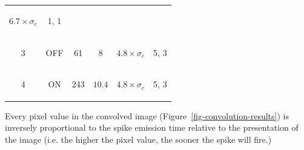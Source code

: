 \begin{table}[htb]
\begin{center}
\begin{tabular}{c c c c c c}
      \begin{mycell}{1.6cm}$6.7 \times \sigma_c$ \end{mycell}& 
      \begin{mycell}{1.6cm}1, 1 \end{mycell}\\
			\begin{mycell}{0.8cm} 3 \end{mycell} &
			\begin{mycell}{1.1cm} \textsc{OFF}\end{mycell} & 
			\begin{mycell}{1.1cm} 61 \end{mycell}& 
			\begin{mycell}{1.6cm}$8$ \end{mycell}& 
      \begin{mycell}{1.6cm}$4.8 \times \sigma_c$ \end{mycell}& 
      \begin{mycell}{1.6cm}5, 3\end{mycell} \\
			\begin{mycell}{0.8cm} 4  \end{mycell} & 
			\begin{mycell}{1.1cm} \textsc{ON} \end{mycell} & 
			\begin{mycell}{1.1cm} 243 \end{mycell} &
			\begin{mycell}{1.6cm}$10.4$\end{mycell} & 
      \begin{mycell}{1.6cm}$4.8 \times \sigma_c$\end{mycell} & 
      \begin{mycell}{1.6cm}5, 3 \end{mycell}
		\end{tabular}
	\end{center}
	\label{tab-kernel-specs}
\end{table}

Every pixel value in the convolved image (Figure~\ref{fig-convolution-results}) 
is inversely proportional to the spike emission time relative to the presentation of the image (i.e. the higher the pixel value, the sooner the spike will fire.)

